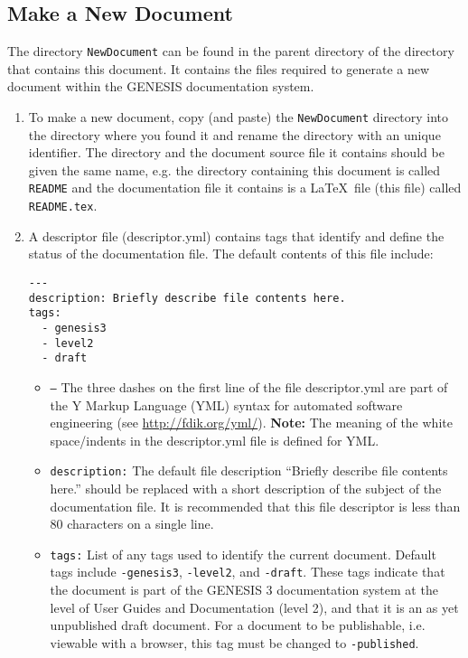 \documentclass[12pt]{article}
\begin{document}
\subsection*{Make a New Document}

The directory {\tt NewDocument} can be found in the parent directory of the directory that contains this document. It contains the files required to generate a new document within the GENESIS documentation system.

\begin{enumerate}

\item To make a new document, copy (and paste) the {\tt NewDocument} directory into the directory where you found it and rename the directory with an unique identifier. The directory and the document source file it contains should be given the same name, e.g. the directory containing this document is called {\tt README} and the documentation file it contains is a \LaTeX\, file (this file) called {\tt README.tex}.

\item A descriptor file (descriptor.yml) contains tags that identify and define the status of the documentation file. The default contents of this file include:
\begin{verbatim}
---
description: Briefly describe file contents here. 
tags:
  - genesis3
  - level2
  - draft
\end{verbatim}

\begin{itemize}

\item {\tt ---} The three dashes on the first line of the file descriptor.yml are part of the Y Markup Language (YML) syntax for automated software engineering (see \href{http://fdik.org/yml/}{http://fdik.org/yml/}). {\bf Note:} The meaning of the white space/indents in the descriptor.yml file is defined for YML.  


\item {\tt description:} The default file description ``Briefly describe file contents here.'' should be replaced with a short description of the subject of the documentation file. It is recommended that this file descriptor is less than 80 characters on a single line.

\item {\tt tags:} List of any tags used to identify the current document. Default tags include {\tt -genesis3}, {\tt -level2}, and {\tt -draft}. These tags indicate that the document is part of the GENESIS 3 documentation system at the level of User Guides and Documentation (level 2), and that it is an as yet unpublished draft document. For a document to be publishable, i.e. viewable with a browser, this tag must be changed to {\tt -published}.

\end{itemize}

\end{enumerate}
\end{document}
